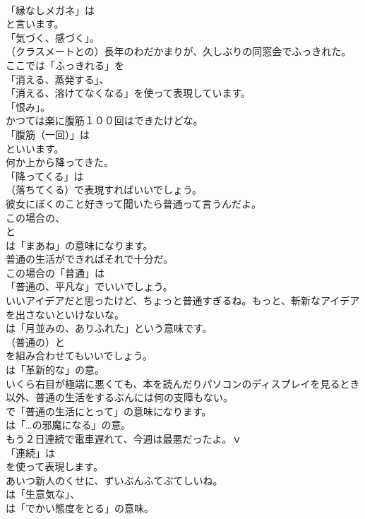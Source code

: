 \documentclass[8pt]{extreport}
\begin{document}
\begin{CJK}{UTF8}{min}
\\	「縁なしメガネ」は
\\	と言います。
\\	「気づく、感づく」。	
\\	（クラスメートとの）長年のわだかまりが、久しぶりの同窓会でふっきれた。 
\\	ここでは「ふっきれる」を
\\	「消える、蒸発する」、
\\	「消える、溶けてなくなる」を使って表現しています。
\\	「恨み」。	
\\	かつては楽に腹筋１００回はできたけどな。 
\\	「腹筋（一回）」は
\\	といいます。	
\\	何か上から降ってきた。 
\\	「降ってくる」は 
\\	（落ちてくる）で表現すればいいでしょう。	
\\	彼女にぼくのこと好きって聞いたら普通って言うんだよ。 
\\	この場合の、
\\	と
\\	は「まあね」の意味になります。	
\\	普通の生活ができればそれで十分だ。 
\\	この場合の「普通」は
\\	「普通の、平凡な」でいいでしょう。	
\\	いいアイデアだと思ったけど、ちょっと普通すぎるね。もっと、斬新なアイデアを出さないといけないな。 
\\	は「月並みの、ありふれた」という意味です。
\\	（普通の）と 
\\	を組み合わせてもいいでしょう。
\\	は「革新的な」の意。	
\\	いくら右目が極端に悪くても、本を読んだりパソコンのディスプレイを見るとき以外、普通の生活をするぶんには何の支障もない。 
\\	で「普通の生活にとって」の意味になります。
\\	は「…の邪魔になる」の意。	
\\	もう２日連続で電車遅れて、今週は最悪だったよ。ｖ 
\\	「連続」は
\\	を使って表現します。	
\\	あいつ新人のくせに、ずいぶんふてぶてしいね。 
\\	は「生意気な」、
\\	は「でかい態度をとる」の意味。	

\end{CJK}
\end{document}
